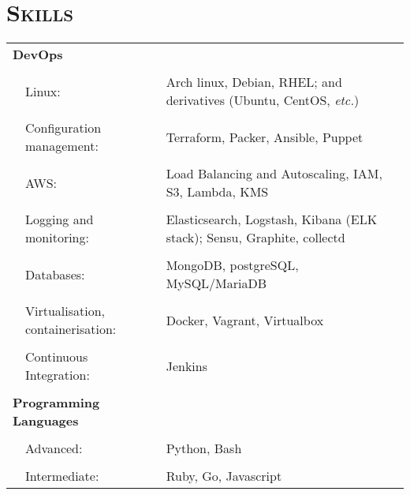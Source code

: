 \documentclass[a4paper,10pt]{article} %
\begin{document}
\section{\textsc{Skills}}
\begin{tabularx}{\textwidth}{p{0.3cm}|p{4cm}X}
\multicolumn{2}{l}{\textbf{DevOps}} & \\
\multicolumn{3}{c}{} \\ %
   & Linux:                              & Arch linux, Debian, RHEL; and derivatives (Ubuntu, CentOS,
                                           \emph{etc.}) \\
     \\
   & Configuration management:           & Terraform, Packer, Ansible, Puppet \\
     \\
   & AWS:                                & Load Balancing and Autoscaling, IAM, S3, Lambda, KMS \\
     \\
   & Logging and monitoring:             & Elasticsearch, Logstash, Kibana (ELK stack); Sensu, Graphite,
                                           collectd \\
     \\
   & Databases:                          & MongoDB, postgreSQL, MySQL/MariaDB \\
     \\
   & Virtualisation, containerisation:   & Docker, Vagrant, Virtualbox \\
     \\
   & Continuous Integration:             & Jenkins \\
\multicolumn{3}{c}{} \\ %
\multicolumn{2}{l}{\textbf{Programming Languages}}      & \\
\multicolumn{3}{c}{} \\ %
  &  Advanced:                           & Python, Bash \\
     \\
  &  Intermediate:                       & Ruby, Go, Javascript\\
\end{tabularx}
\end{document}
